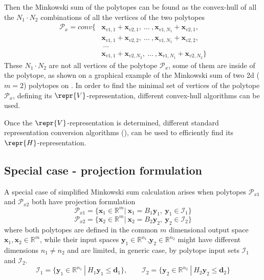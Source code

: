 Then the Minkowski sum of the polytopes can be found as the convex-hull of all the $N_1\!\cdot\!N_2$ combinations of all the vertices of the two polytopes
\begin{equation}
\begin{split}
    \mathcal{P}_x =  conv\big\{&\bm{x}_{v1,1} + \bm{x}_{v2,1},~ \ldots~,\bm{x}_{v1, N_1} + \bm{x}_{v2,1},\\&\bm{x}_{v1,1} + \bm{x}_{v2,2},~\ldots~,\bm{x}_{v1, N_1} + \bm{x}_{v2,2},\\&~\ldots~\\
    &\bm{x}_{v1, 1}  +\bm{x}_{v2,N_2}, ~\ldots~ ,\bm{x}_{v1, N_1} +\bm{x}_{v2,N_2}\big\}
\end{split}
\end{equation}
These $N_1\!\cdot\!N_2$ are not all vertices of the polytope $\mathcal{P}_x$, some of them are inside of the polytope, as shown on a graphical example of the Minkowski sum of two  2d ($m=2$) polytopes on . In order to find the minimal set of vertices of the polytope $\mathcal
{P}_x$, defining its $\repr{V}$-representation, different convex-hull algorithms \cite{Barber1996} can be used.

Once the $\repr{V}$-representation is determined, different standard representation conversion algorithms (), can be used to efficiently find its $\repr{H}$-representation.


\subsection{Special case - projection formulation}
A special case of simplified Minkowski sum calculation arises when polytopes $\mathcal{P}_{x1}$ and $\mathcal{P}_{x2}$ both have projection formulation
\begin{equation}
    \mathcal{P}_{x1}=\{\bm{x}_1\in\mathbb{R}^m |~ \bm{x}_1 = B_1\bm{y}_1,~\bm{y}_1 \in \mathcal{I}_1  \}
\end{equation}
\begin{equation}
    \mathcal{P}_{x2}=\{\bm{x}_2\in\mathbb{R}^m |~ \bm{x}_2 = B_2\bm{y}_2,~\bm{y}_2 \in \mathcal{I}_2  \}
\end{equation}
where both polytopes are defined in the common $m$ dimensional output space $\bm{x}_1,\bm{x}_2\in\mathbb{R}^m$, while their input spaces $\bm{y}_1\in\mathbb{R}^{n_1}$,$\bm{y}_2\in\mathbb{R}^{n_2}$ might have different dimensions $n_1\neq n_2$ and are limited, in generic case, by polytope input sets $\mathcal{I}_1$ and $\mathcal{I}_2$.
\begin{equation}
    \mathcal{I}_{1}=\{\bm{y}_1\in\mathbb{R}^{n_1} ~|~ H_1\bm{y}_1 \leq \bm{d}_1\}, \qquad
    \mathcal{I}_{2}=\{\bm{y}_2\in\mathbb{R}^{n_2} ~|~ H_2\bm{y}_2 \leq \bm{d}_2\}
\end{equation}

